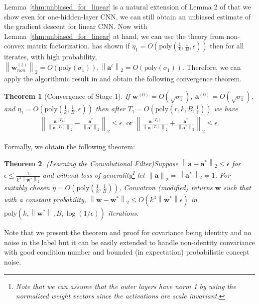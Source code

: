 \documentclass[11pt]{article}
\newcommand{\poly}{\mathrm{poly}}
\newcommand{\vect}[1]{\mathbf{#1}}
\newcommand{\norm}[1]{\left\|#1\right\|}
\newtheorem{thm}{Theorem}[section]
\begin{document}
Lemma~\ref{thm:unbiased_for_linear} is a natural extension of Lemma 2 of \cite{goel2018learning} that we show even for one-hidden-layer CNN, we can still obtain an unbiased estimate of the gradient descent for linear CNN.
Now with Lemma~\ref{thm:unbiased_for_linear} at hand, we can use  the theory from non-convex matrix factorization.
\cite{ge2017no} has shown if $\eta_1 = O\left(\poly\left(\frac{1}{k},\frac{1}{B},\epsilon\right)\right)$ then for all iterates, with high probability, $\norm{\vect{w}_{non}^{(t)}}_2 = O(\poly\left(\sigma_1\right)), \norm{\vect{a}^{t}}_2 = O(\poly\left(\sigma_1\right))$.
Therefore, we can apply the algorithmic result in \cite{ge2015escaping} and obtain the following convergence theorem.
\begin{thm}[Convergence of Stage 1]
\label{thm:linear_cnn}
If $\vect{w}^{(0)} = O\left(\sqrt{\sigma_1}\right)$, $\vect{a}^{(0)} = O\left(\sqrt{\sigma_1}\right)$, and $\eta_1 = O\left(\poly\left(\frac{1}{k},\frac{1}{B},\epsilon\right)\right)$ then after $T_1 =O\left(\poly\left(r,k,B,\frac{1}{\epsilon}\right)\right)$
 we have 
	\begin{align*}
		\norm{\frac{\vect{a}^{(T_1)}}{\norm{\vect{a}^{(T_1)}}_2}-\frac{\vect{a}^*}{\norm{\vect{a}^*}_2}}_2 \le \epsilon. \text{ or }\norm{\frac{\vect{a}^{(T_1)}}{\norm{\vect{a}^{(T_1)}}_2}+\frac{\vect{a}^*}{\norm{\vect{a}^*}_2}}_2 \le \epsilon.
	\end{align*}
\end{thm}%
Formally, we obtain the following theorem:
\begin{thm}(Learning the Convolutional Filter)\label{thm:convotron}
Suppose $\norm{\vect{a}-\vect{a}^*}_2 \leq \epsilon$ for $\epsilon \leq \frac{1}{k^3\norm{\vect{w}^*}_2}$ and without loss of generality\footnote{Note that we can assume that the outer layers have norm 1 by using the normalized weight vectors since the activations are scale invariant.} let $\norm{\vect{a}}_2 = \norm{\vect{a}^*}_2 = 1$. For suitably chosen $\eta = O\left(\poly\left(\frac{1}{k},\frac{1}{B}\right)\right)$, Convotron (modified) returns $\vect{w}$ such that with a constant probability, $\norm{\vect{w}-\vect{w}^*}_2 \leq O(k^3\norm{\vect{w}^*}\epsilon)$ in $\poly(k, \norm{\vect{w}^*}, B, \log(1/\epsilon))$ iterations.
\end{thm}
Note that we present the theorem and proof for covariance being identity and no noise in the label but it can be easily extended to handle non-identity convariance with good condition number and bounded (in expectation) probabilistic concept noise.
\end{document}
